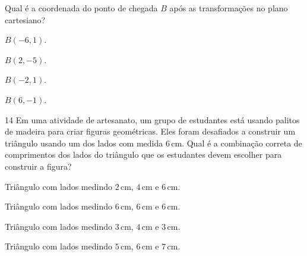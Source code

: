 Qual é a coordenada do ponto de chegada $B$ após as transformações no plano cartesiano?

\begin{escolha}
\item $B(-6,1)$.

\item $B(2,-5)$.

\item $B(-2,1)$.

\item $B(6,-1)$.
\end{escolha}



\num{14} Em uma atividade de artesanato, um grupo de estudantes está usando
palitos de madeira para criar figuras geométricas. Eles foram desafiados a
construir um triângulo usando um dos lados com medida $6\,\text{cm}$.
Qual é a combinação correta de comprimentos dos lados do triângulo que os
estudantes devem escolher para construir a figura?

\begin{escolha}
\item Triângulo com lados medindo $2\,\text{cm}$, $4\,\text{cm}$ e $6\,\text{cm}$.

\item Triângulo com lados medindo $6\,\text{cm}$, $6\,\text{cm}$ e $6\,\text{cm}$.

\item Triângulo com lados medindo $3\,\text{cm}$, $4\,\text{cm}$ e $3\,\text{cm}$.

\item Triângulo com lados medindo $5\,\text{cm}$, $6\,\text{cm}$ e $7\,\text{cm}$.
\end{escolha}

